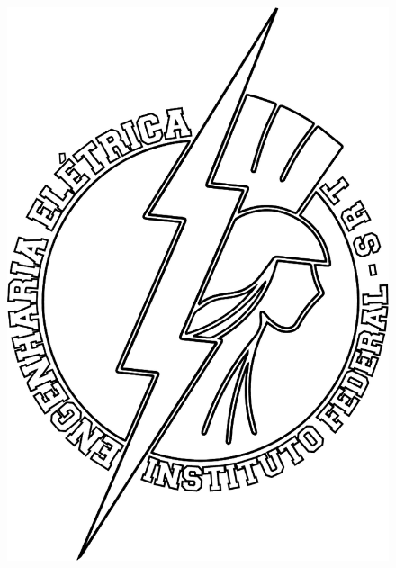 \documentclass[../Main.tex]{subfiles}
\begin{document}
    \begin{minipage}{0.26\linewidth}
    	\begin{figure}[H]
    		\flushright
    		\includegraphics[scale=0.07]{Images/logo-eng2}
    	\end{figure}
    \end{minipage}
    
    \vspace{0.5cm}
    
\end{document}
